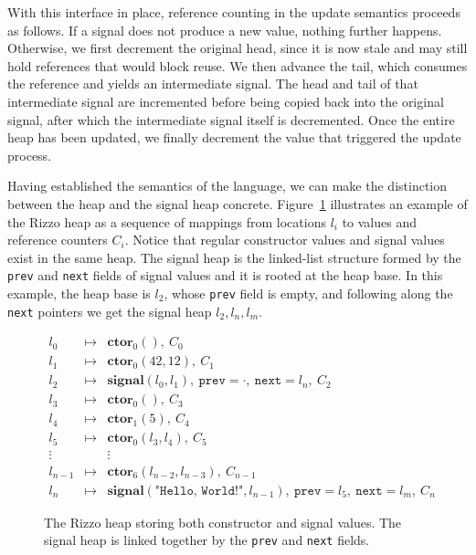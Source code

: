 With this interface in place, reference counting in the update semantics proceeds as follows.
If a signal does not produce a new value, nothing further happens. 
Otherwise, we first decrement the original head, since it is now stale and may still hold references that would block reuse. We then advance the tail, which consumes the reference and yields an intermediate signal. The head and tail of that intermediate signal are incremented before being copied back into the original signal, after which the intermediate signal itself is decremented.
Once the entire heap has been updated, we finally decrement the value that triggered the update process.


Having established the semantics of the language, we can make the distinction between the heap and the signal heap concrete. 
Figure~\ref{figure:semantics:heap_vis} illustrates an example of the Rizzo heap as a sequence of mappings from locations $l_i$ to values and reference counters $C_i$.
Notice that regular constructor values and signal values exist in the same heap.
The signal heap is the linked-list structure formed by the \texttt{prev} and \texttt{next} fields of signal values and it is rooted at the heap base.
In this example, the heap base is $l_2$, whose \texttt{prev} field is empty, and following along the \texttt{next} pointers we get the signal heap $l_2, l_n, l_m$.

\begin{figure}[h]
    \centering
    \[\begin{array}{rcl}
        l_0 &\mapsto& \mathbf{ctor}_0(),\ C_0 \\
        l_1 &\mapsto& \mathbf{ctor}_0(42, 12),\ C_1 \\
        l_2 &\mapsto& \mathbf{signal}(l_0, l_1),\ \texttt{prev}=\cdot,\ \texttt{next}=l_n,\ C_2 \\
        l_3 &\mapsto& \mathbf{ctor}_0(),\ C_3 \\
        l_4 &\mapsto& \mathbf{ctor}_1(5),\ C_4 \\
        l_5 &\mapsto& \mathbf{ctor}_0(l_3, l_4),\ C_5 \\
        \vdots & & \vdots \\
        l_{n-1} &\mapsto& \mathbf{ctor}_6(l_{n-2}, l_{n-3}),\ C_{n-1} \\
        l_n &\mapsto& \mathbf{signal}(\texttt{"Hello, World!"}, l_{n-1}),\ \texttt{prev}=l_5,\ \texttt{next}=l_m,\ C_n
    \end{array}\]
    \caption{The Rizzo heap storing both constructor and signal values. The signal heap is linked together by the \texttt{prev} and \texttt{next} fields.}\label{figure:semantics:heap_vis}
\end{figure}


